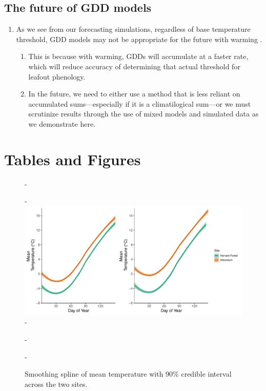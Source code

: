 \documentclass{article}\usepackage[]{graphicx}\usepackage[]{color}
\begin{document}
\subsection*{The future of GDD models}
\begin{enumerate}
\item As we see from our forecasting simulations, regardless of base temperature threshold, GDD models may not be appropriate for the future with warming \citep{Man2010}. 
  \begin{enumerate}
  \item This is because with warming, GDDs will accumulate at a faster rate, which will reduce accuracy of determining that actual threshold for leafout phenology. 
  \item In the future, we need to either use a method that is less reliant on accumulated sums---especially if it is a climatilogical sum---or we must scrutinize results through the use of mixed models and simulated data as we demonstrate here. 
  \end{enumerate}
\end{enumerate}






\section*{Tables and Figures}
  
{\begin{figure} [H]
  -\begin{center}
  -\includegraphics[width=12cm]{..//analyses/figures/climate_hfandts.pdf}
  -\caption{Smoothing spline of mean temperature with 90\% credible interval across the two sites.}\label{fig:clim}
  -\end{center}
  -\end{figure}}
  
\end{document}
